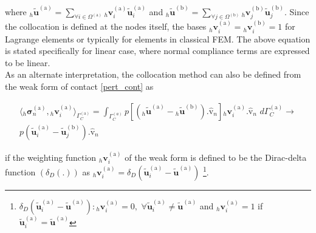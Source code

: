 where ${{}_h\widetilde{\bm u}}^{(\mathrm a)} = \sum_{\forall {i} \in \Omega^{(\mathrm a)}} {}_h\bm v_i^\mathrm{(a)} \widetilde{\bm u}_i^\mathrm{(a)}$ and ${{}_h\widetilde{\bm u}}^{(\mathrm b)} = \sum_{\forall {j} \in \Omega^{(\mathrm b)}} {}_h\bm v_j^\mathrm{(b)} \widetilde{\bm u}_j^\mathrm{(b)}$. Since the collocation is defined at the nodes itself, the bases ${}_h \bm v_i^\mathrm{(a)}= {}_h \bm v_i^\mathrm{(b)}=1$ for Lagrange elements or typically for elements in classical FEM. The above equation is stated specifically for linear case, where normal compliance terms are expressed to be linear.\\

As an alternate interpretation, the collocation method can also be defined from the weak form of contact \eqref{pert_cont} as

\begin{multline}
{\langle {}_h \bm{\sigma}^{\mathrm{(a)}}_n, {}_h \bm v_i^\mathrm{(a)} \rangle_{\Gamma_C^{\mathrm{(a)}}}} =\int_{\Gamma^{(a)}_C}  \mathit{p}[({{}_h\widetilde{\bm u}}^{(\mathrm a)} - {{}_h \widetilde{\bm u}}^{ ( \mathrm b)}). \bm{\hat{\mathrm v}}_n]  {}_h \bm v_i^\mathrm{(a)}. \bm{\hat{\mathrm v}}_n \,\,d{\Gamma^{(\mathrm a)}_C}
\rightarrow\\ 
p ( \widetilde{ \bm u}_{{i}}^{(\mathrm a)}- \widetilde{ \bm u}_{{j}}^{(\mathrm b)}). \bm{\hat{\mathrm v}}_n\end{multline}

if the weighting function $ {}_h \bm v_i^\mathrm{(a)}$ of the weak form is defined to be the Dirac-delta function $(\delta_D(.))$ as $ {}_h \bm v_i^\mathrm{(a)} = \delta_D(\widetilde{ \bm u}_{{i}}^{(\mathrm a)} - \widetilde{ \bm u}^{(\mathrm a)})$ \footnote{$ \delta_D(\widetilde{ \bm u}_{{i}}^{(\mathrm a)} - \widetilde{ \bm u}^{(\mathrm a)}): {}_h \bm v_i^\mathrm{(a)} = 0, \,\, \forall \widetilde{ \bm u}_{{i}}^{(\mathrm a)} \neq \widetilde{ \bm u}^{(\mathrm a)}$ and ${}_h \bm v_i^\mathrm{(a)} = 1$ if $\widetilde{ \bm u}_{{i}}^{(\mathrm a)} = \widetilde{ \bm u}^{(\mathrm a)}$}.\\


